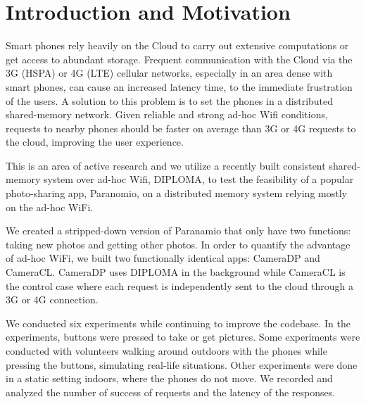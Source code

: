 \chapter{Introduction and Motivation}

Smart phones rely heavily on the Cloud to carry out extensive computations or get access to abundant storage. Frequent communication with the Cloud via the 3G (HSPA) or 4G (LTE) cellular networks, especially in an area dense with smart phones, can cause an increased latency time, to the immediate frustration of the users. A solution to this problem is to set the phones in a distributed shared-memory network. Given reliable and strong ad-hoc Wifi conditions, requests to nearby phones should be faster on average than 3G or 4G requests to the cloud, improving the user experience. 

This is an area of active research and we utilize a recently built consistent shared-memory system over ad-hoc Wifi, DIPLOMA, to test the feasibility of a popular photo-sharing app, Paranomio, on a distributed memory system relying mostly on the ad-hoc WiFi.

We created a stripped-down version of Paranamio that only have two functions: taking new photos and getting other photos. In order to quantify the advantage of ad-hoc WiFi, we built two functionally identical apps: CameraDP and CameraCL. CameraDP uses DIPLOMA in the background while CameraCL is the control case where each request is independently sent to the cloud through a 3G or 4G connection.

We conducted six experiments while continuing to improve the codebase. In the experiments, buttons were pressed to take or get pictures. Some experiments were conducted with volunteers walking around outdoors with the phones while pressing the buttons, simulating real-life situations. Other experiments were done in a static setting indoors, where the phones do not move. We recorded and analyzed the number of success of requests and the latency of the responses.